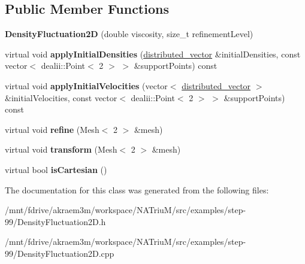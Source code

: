 \subsection*{Public Member Functions}
\begin{DoxyCompactItemize}
\item 
\hypertarget{classnatrium_1_1DensityFluctuation2D_aac8ea303ea740e73868cd1ee431e182f}{
{\bfseries DensityFluctuation2D} (double viscosity, size\_\-t refinementLevel)}
\label{classnatrium_1_1DensityFluctuation2D_aac8ea303ea740e73868cd1ee431e182f}

\item 
\hypertarget{classnatrium_1_1DensityFluctuation2D_a7d345499b56b65e0b107defcd5c89e2e}{
virtual void {\bfseries applyInitialDensities} (\hyperlink{namespacenatrium_a903d2b92917f582f2ff05f52160ab811}{distributed\_\-vector} \&initialDensities, const vector$<$ dealii::Point$<$ 2 $>$ $>$ \&supportPoints) const }
\label{classnatrium_1_1DensityFluctuation2D_a7d345499b56b65e0b107defcd5c89e2e}

\item 
\hypertarget{classnatrium_1_1DensityFluctuation2D_a217a8d3635da81fb0350671a86142b57}{
virtual void {\bfseries applyInitialVelocities} (vector$<$ \hyperlink{namespacenatrium_a903d2b92917f582f2ff05f52160ab811}{distributed\_\-vector} $>$ \&initialVelocities, const vector$<$ dealii::Point$<$ 2 $>$ $>$ \&supportPoints) const }
\label{classnatrium_1_1DensityFluctuation2D_a217a8d3635da81fb0350671a86142b57}

\item 
\hypertarget{classnatrium_1_1DensityFluctuation2D_af158622965391ef1c856587d9fb993b7}{
virtual void {\bfseries refine} (Mesh$<$ 2 $>$ \&mesh)}
\label{classnatrium_1_1DensityFluctuation2D_af158622965391ef1c856587d9fb993b7}

\item 
\hypertarget{classnatrium_1_1DensityFluctuation2D_a7b7215ba2073404b076a517ffe2c34ea}{
virtual void {\bfseries transform} (Mesh$<$ 2 $>$ \&mesh)}
\label{classnatrium_1_1DensityFluctuation2D_a7b7215ba2073404b076a517ffe2c34ea}

\item 
\hypertarget{classnatrium_1_1DensityFluctuation2D_ab7252f3befc36e5bee27b490292dd082}{
virtual bool {\bfseries isCartesian} ()}
\label{classnatrium_1_1DensityFluctuation2D_ab7252f3befc36e5bee27b490292dd082}

\end{DoxyCompactItemize}


The documentation for this class was generated from the following files:\begin{DoxyCompactItemize}
\item 
/mnt/fdrive/akraem3m/workspace/NATriuM/src/examples/step-\/99/DensityFluctuation2D.h\item 
/mnt/fdrive/akraem3m/workspace/NATriuM/src/examples/step-\/99/DensityFluctuation2D.cpp\end{DoxyCompactItemize}
